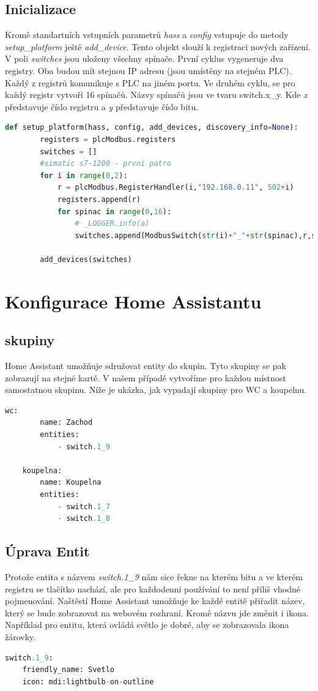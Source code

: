 \documentclass[a4paper,12pt,czech,bibliography=totoc]{scrbook}
\begin{document}
\subsection{Inicializace}
Kromě standartních vstupních parametrů \textit{hass} a \textit{config} vstupuje do metody \textit{setup\_platform} ještě \textit{add\_device}. Tento objekt slouží k registraci nových zařízení. V poli \textit{switches} jsou uloženy všechny spínače.
\newline
První cyklus vygeneruje dva registry. Oba budou mít stejnou IP adresu (jsou umístěny na stejném PLC). Každý z registrů komunikuje s PLC na jiném portu. 
\newline
Ve druhém cyklu, se pro každý registr vytvoří 16 spínačů. Názvy spínačů jsou ve tvaru switch.x\_y. Kde \textit{x} představuje číslo registru a \textit{y} představuje číslo bitu. 

\begin{lstlisting}[language=Python]
	def setup_platform(hass, config, add_devices, discovery_info=None):
		registers = plcModbus.registers
		switches = []
		#simatic s7-1200 - prvni patro
		for i in range(0,2):
			r = plcModbus.RegisterHandler(i,"192.168.0.11", 502+i)
			registers.append(r)
			for spinac in range(0,16):
				# _LOGGER.info(a)
				switches.append(ModbusSwitch(str(i)+"_"+str(spinac),r,spinac))

		add_devices(switches)
\end{lstlisting}
\section{Konfigurace Home Assistantu}
	\subsection{skupiny}
	Home Assistant umožňuje sdružovat entity do skupin. Tyto skupiny se pak zobrazují na stejné kartě. V našem případě vytvoříme pro každou místnost samostatnou skupinu. Níže je ukázka, jak vypadají skupiny pro WC a koupelnu. 
	\begin{lstlisting}[language=Python]
	wc:
		name: Zachod
		entities:
			- switch.1_9

	koupelna:
		name: Koupelna
		entities:
			- switch.1_7
			- switch.1_8
	\end{lstlisting}

	\subsection{Úprava Entit}
	Protože entita s názvem \textit{switch.1\_9} nám sice řekne na kterém bitu a ve kterém registru se tlačítko nachází, ale pro každodenní používání to není příliš vhodné pojmenování. Naštěstí Home Assistant umožňuje ke každé entitě přiřadit název, který se bude zobrazovat na webovém rozhraní. Kromě názvu jde změnit i ikona. Například pro entitu, která ovládá světlo je dobré, aby se zobrazovala ikona žárovky.
		\begin{lstlisting}[language=Python]
switch.1_9:
	friendly_name: Svetlo
	icon: mdi:lightbulb-on-outline
	\end{lstlisting}
\end{document}
